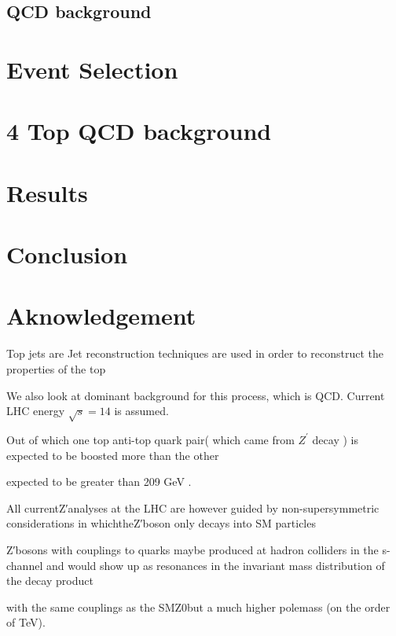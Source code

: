 \documentclass[12pt,a4paper]{article}		%
\begin{document}
\newpage







\newpage
\subsection{QCD background}

\newpage

\section{Event Selection}
\newpage
\section{4 Top QCD background}
\newpage
\section{Results}
\newpage
\section{Conclusion}
\newpage
\section{Aknowledgement}	 
	\newpage 

   Top jets are Jet reconstruction techniques are used in order to reconstruct the properties of the top     

We also look at dominant background for this process, which is QCD.  Current LHC energy $\sqrt{s} = 14$ is assumed. 


Out of which one top anti-top quark pair( which came from $Z^\prime$ decay ) is expected to be boosted more than the other  


 
expected to be greater than 209 GeV .


  All currentZ′analyses at the LHC are however guided by non-supersymmetric considerations in whichtheZ′boson only decays into SM particles  

Z′bosons with couplings to quarks maybe produced at hadron colliders in the s-channel and would show up as resonances in the invariant mass distribution of the decay product
 

with  the  same  couplings  as  the  SMZ0but a much higher polemass (on the order of TeV).     
\end{document}
